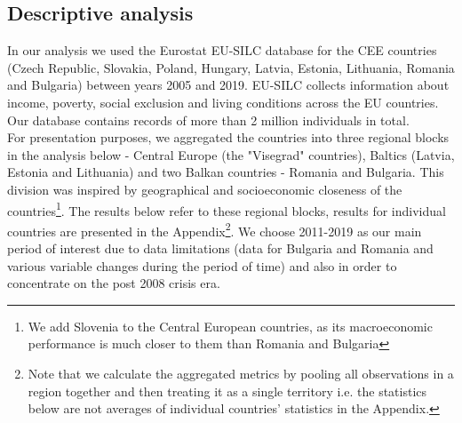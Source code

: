 \documentclass{article}
\begin{document}
\subsection{Descriptive analysis}
In our analysis we used the Eurostat EU-SILC database for the CEE countries (Czech Republic, Slovakia, Poland, Hungary, Latvia, Estonia, Lithuania, Romania and Bulgaria) between years 2005 and 2019. EU-SILC collects information about income, poverty, social exclusion and living conditions across the EU countries. Our database contains records of more than 2 million individuals in total.\\ For presentation purposes, we aggregated the countries into three regional blocks in the analysis below - Central Europe (the "Visegrad" countries), Baltics (Latvia, Estonia and Lithuania) and two Balkan countries - Romania and Bulgaria. This division was inspired by geographical and socioeconomic closeness of the countries\footnote{We add Slovenia to the Central European countries, as its macroeconomic performance is much closer to them than Romania and Bulgaria}. The results below refer to these regional blocks, results for individual countries are presented in the Appendix\footnote{Note that we calculate the aggregated metrics by pooling all observations in a region together and then treating it as a single territory i.e. the statistics below are not averages of individual countries' statistics in the Appendix.}. We choose 2011-2019 as our main period of interest due to data limitations (data for Bulgaria and Romania and various variable changes during the period of time) and also in order to concentrate on the post 2008 crisis era.\\
\end{document}
